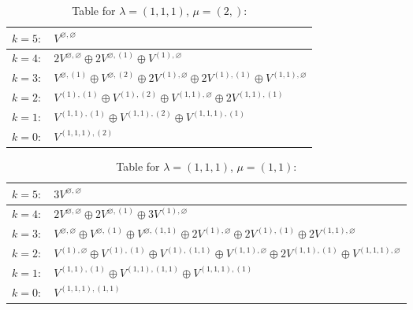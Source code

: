 \renewcommand{\arraystretch}{1.6} 
\begin{table}[H]
\centering
\caption{Table for $\lambda = (1, 1, 1)$, $\mu = (2,)$:}
\begin{tabular}{|>{\centering\arraybackslash}p{15cm}|}
\hline
 $k = 5: \quad V^{\varnothing, \varnothing} $ \\ \hline
 $k = 4: \quad 2 V^{\varnothing, \varnothing} \oplus 2 V^{\varnothing, (1)} \oplus V^{(1), \varnothing} $ \\ \hline
 $k = 3: \quad V^{\varnothing, (1)} \oplus V^{\varnothing, (2)} \oplus 2 V^{(1), \varnothing} \oplus 2 V^{(1), (1)} \oplus V^{(1, 1), \varnothing} $ \\ \hline
 $k = 2: \quad V^{(1), (1)} \oplus V^{(1), (2)} \oplus V^{(1, 1), \varnothing} \oplus 2 V^{(1, 1), (1)} $ \\ \hline
 $k = 1: \quad V^{(1, 1), (1)} \oplus V^{(1, 1), (2)} \oplus V^{(1, 1, 1), (1)} $ \\ \hline
 $k = 0: \quad V^{(1, 1, 1), (2)} $ \\ \hline
\end{tabular}
\end{table}

\renewcommand{\arraystretch}{1.6} 
\begin{table}[H]
\centering
\caption{Table for $\lambda = (1, 1, 1)$, $\mu = (1, 1)$:}
\begin{tabular}{|>{\centering\arraybackslash}p{15cm}|}
\hline
 $k = 5: \quad 3 V^{\varnothing, \varnothing} $ \\ \hline
 $k = 4: \quad 2 V^{\varnothing, \varnothing} \oplus 2 V^{\varnothing, (1)} \oplus 3 V^{(1), \varnothing} $ \\ \hline
 $k = 3: \quad V^{\varnothing, \varnothing} \oplus V^{\varnothing, (1)} \oplus V^{\varnothing, (1, 1)} \oplus 2 V^{(1), \varnothing} \oplus 2 V^{(1), (1)} \oplus 2 V^{(1, 1), \varnothing} $ \\ \hline
 $k = 2: \quad V^{(1), \varnothing} \oplus V^{(1), (1)} \oplus V^{(1), (1, 1)} \oplus V^{(1, 1), \varnothing} \oplus 2 V^{(1, 1), (1)} \oplus V^{(1, 1, 1), \varnothing} $ \\ \hline
 $k = 1: \quad V^{(1, 1), (1)} \oplus V^{(1, 1), (1, 1)} \oplus V^{(1, 1, 1), (1)} $ \\ \hline
 $k = 0: \quad V^{(1, 1, 1), (1, 1)} $ \\ \hline
\end{tabular}
\end{table}

